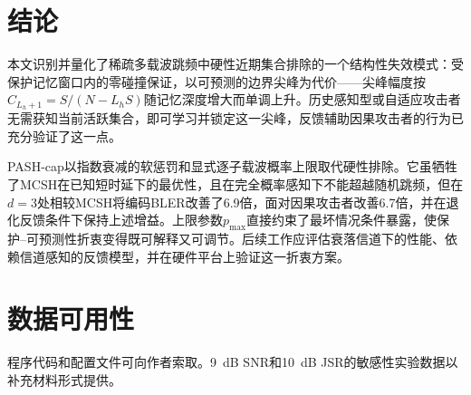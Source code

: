 \documentclass[lettersize,journal]{IEEEtran}
\begin{document}
\section{结论}
本文识别并量化了稀疏多载波跳频中硬性近期集合排除的一个结构性失效模式：受保护记忆窗口内的零碰撞保证，以可预测的边界尖峰为代价——尖峰幅度按$C_{L_h+1}=S/(N-L_hS)$随记忆深度增大而单调上升。历史感知型或自适应攻击者无需获知当前活跃集合，即可学习并锁定这一尖峰，反馈辅助因果攻击者的行为已充分验证了这一点。

PASH-cap以指数衰减的软惩罚和显式逐子载波概率上限取代硬性排除。它虽牺牲了MCSH在已知短时延下的最优性，且在完全概率感知下不能超越随机跳频，但在$d{=}3$处相较MCSH将编码BLER改善了6.9倍，面对因果攻击者改善6.7倍，并在退化反馈条件下保持上述增益。上限参数$p_{\max}$直接约束了最坏情况条件暴露，使保护--可预测性折衷变得既可解释又可调节。后续工作应评估衰落信道下的性能、依赖信道感知的反馈模型，并在硬件平台上验证这一折衷方案。

\section*{数据可用性}
程序代码和配置文件可向作者索取。9~dB SNR和10~dB JSR的敏感性实验数据以补充材料形式提供。



\end{document}
